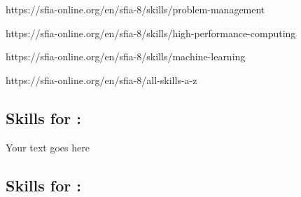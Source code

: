 \documentclass[a4paper, 11pt]{report}
\begin{document}
https://sfia-online.org/en/sfia-8/skills/problem-management

https://sfia-online.org/en/sfia-8/skills/high-performance-computing

https://sfia-online.org/en/sfia-8/skills/machine-learning

https://sfia-online.org/en/sfia-8/all-skills-a-z


\subsection{Skills for \majB: \studB}

Your text goes here

\subsection{Skills for \majC: \studC}
\end{document}
